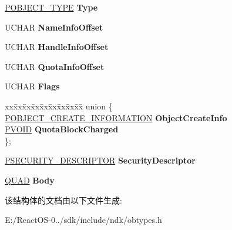 \begin{DoxyCompactItemize}
\begin{tabbing}
\end{tabbing}\item 
\mbox{\label{struct___o_b_j_e_c_t___h_e_a_d_e_r_ad85a9639bddc07f3a28c16f59336f7ce}} 
\hyperlink{struct___o_b_j_e_c_t___t_y_p_e}{P\+O\+B\+J\+E\+C\+T\+\_\+\+T\+Y\+PE} {\bfseries Type}
\item 
\mbox{\label{struct___o_b_j_e_c_t___h_e_a_d_e_r_a57a44bb124890b592dfaaa94bcdc2171}} 
U\+C\+H\+AR {\bfseries Name\+Info\+Offset}
\item 
\mbox{\label{struct___o_b_j_e_c_t___h_e_a_d_e_r_a3e3f3a20de9ae2a63578091f28f69d74}} 
U\+C\+H\+AR {\bfseries Handle\+Info\+Offset}
\item 
\mbox{\label{struct___o_b_j_e_c_t___h_e_a_d_e_r_ad58cc78f26530d3ac8869b5dbfc80f1e}} 
U\+C\+H\+AR {\bfseries Quota\+Info\+Offset}
\item 
\mbox{\label{struct___o_b_j_e_c_t___h_e_a_d_e_r_a38d210935f4796127e575f97f7dd315d}} 
U\+C\+H\+AR {\bfseries Flags}
\item 
\mbox{\label{struct___o_b_j_e_c_t___h_e_a_d_e_r_a3a3fbd567623871cb32e6dd1727404f8}} 
\begin{tabbing}
xx\=xx\=xx\=xx\=xx\=xx\=xx\=xx\=xx\=\kill
union \{\\
\>\hyperlink{struct___o_b_j_e_c_t___c_r_e_a_t_e___i_n_f_o_r_m_a_t_i_o_n}{POBJECT\_CREATE\_INFORMATION} {\bfseries ObjectCreateInfo}\\
\>\hyperlink{interfacevoid}{PVOID} {\bfseries QuotaBlockCharged}\\
\}; \\

\end{tabbing}\item 
\mbox{\label{struct___o_b_j_e_c_t___h_e_a_d_e_r_a0f2dade8368c69820f433ae84ba3f11b}} 
\hyperlink{struct___s_e_c_u_r_i_t_y___d_e_s_c_r_i_p_t_o_r}{P\+S\+E\+C\+U\+R\+I\+T\+Y\+\_\+\+D\+E\+S\+C\+R\+I\+P\+T\+OR} {\bfseries Security\+Descriptor}
\item 
\mbox{\label{struct___o_b_j_e_c_t___h_e_a_d_e_r_a06cc76e76e3baf6a59b52f1bf7507850}} 
\hyperlink{struct___q_u_a_d}{Q\+U\+AD} {\bfseries Body}
\end{DoxyCompactItemize}


该结构体的文档由以下文件生成\+:\begin{DoxyCompactItemize}
\item 
E\+:/\+React\+O\+S-\/0../sdk/include/ndk/obtypes.\+h\end{DoxyCompactItemize}
